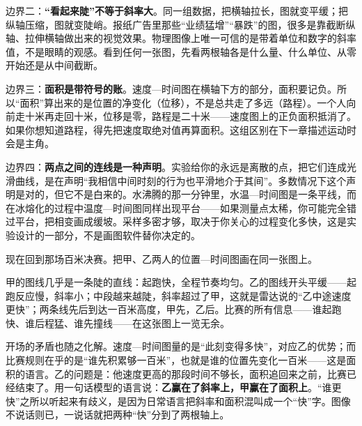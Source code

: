边界二：\textbf{“看起来陡”不等于斜率大}。同一组数据，把横轴拉长，图就变平缓；把纵轴压缩，图就变陡峭。报纸广告里那些“业绩猛增”“暴跌”的图，很多是靠截断纵轴、拉伸横轴做出来的视觉效果。物理图像上唯一可信的是带着单位和数字的斜率值，不是眼睛的观感。看到任何一张图，先看两根轴各是什么量、什么单位、从零开始还是从中间截断。

边界三：\textbf{面积是带符号的账}。速度—时间图在横轴下方的部分，面积要记负。所以“面积”算出来的是位置的净变化（位移），不是总共走了多远（路程）。一个人向前走十米再走回十米，位移是零，路程是二十米——速度图上的正负面积抵消了。如果你想知道路程，得先把速度取绝对值再算面积。这组区别在下一章描述运动时会是主角。

边界四：\textbf{两点之间的连线是一种声明}。实验给你的永远是离散的点，把它们连成光滑曲线，是在声明“我相信中间时刻的行为也平滑地介于其间”。多数情况下这个声明是对的，但它不是白来的。水沸腾的那一分钟里，水温—时间图是一条平线，而在冰熔化的过程中温度—时间图同样出现平台——如果测量点太稀，你可能完全错过平台，把相变画成缓坡。采样多密才够，取决于你关心的过程变化多快，这是实验设计的一部分，不是画图软件替你决定的。


现在回到那场百米决赛。把甲、乙两人的位置—时间图画在同一张图上。

\begin{center}
\end{center}

甲的图线几乎是一条陡的直线：起跑快，全程节奏均匀。乙的图线开头平缓——起跑反应慢，斜率小；中段越来越陡，斜率超过了甲，这就是雷达说的“乙中途速度更快”；两条线先后到达一百米高度，甲先，乙后。比赛的所有信息——谁起跑快、谁后程猛、谁先撞线——在这张图上一览无余。

开场的矛盾也随之化解。速度—时间图量的是“此刻变得多快”，对应乙的优势；而比赛规则在乎的是“谁先积累够一百米”，也就是谁的位置先变化一百米——这是面积的语言。乙的问题是：他速度更高的那段时间不够长，面积追回来之前，比赛已经结束了。用一句话模型的语言说：\textbf{乙赢在了斜率上，甲赢在了面积上}。“谁更快”之所以听起来有歧义，是因为日常语言把斜率和面积混叫成一个“快”字。图像不说话则已，一说话就把两种“快”分到了两根轴上。


